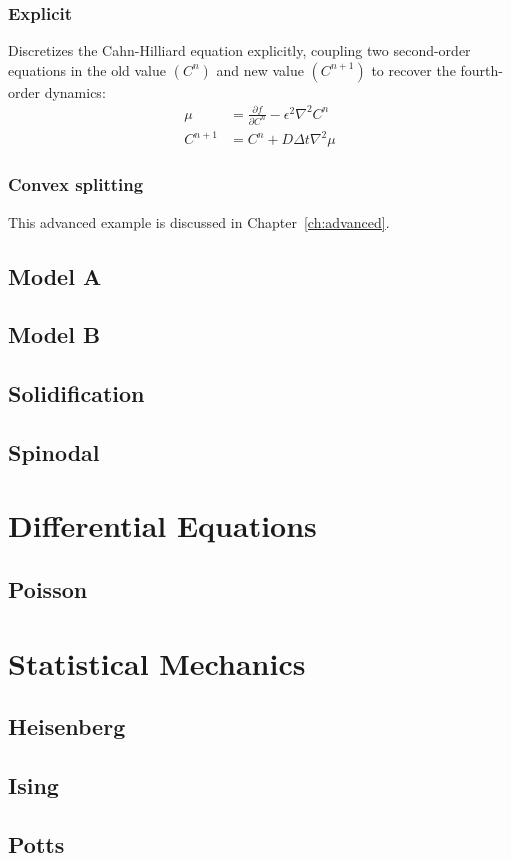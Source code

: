 		\subsubsection{Explicit}
			Discretizes the Cahn-Hilliard equation explicitly, coupling two second-order equations
			in the old value $(C^n)$ and new value $(C^{n+1})$ to recover the fourth-order dynamics:
			\begin{align*}
				\mu &= \frac{\partial f}{\partial C^n} - \epsilon^2\nabla^2 C^n\\
				C^{n+1} &= C^n + D\Delta t\nabla^2\mu
			\end{align*}

		\subsubsection{Convex splitting}
			This advanced example is discussed in Chapter~\ref{ch:advanced}.
			

	\subsection{Model A}
	\subsection{Model B}
	\subsection{Solidification}
	\subsection{Spinodal}


\section{Differential Equations}
	\subsection{Poisson}

\section{Statistical Mechanics}
	\subsection{Heisenberg}
	\subsection{Ising}
	\subsection{Potts}

